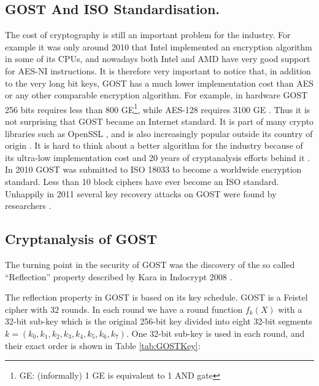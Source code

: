 \subsection{GOST And ISO Standardisation.}
The cost of cryptography is still an important problem for the industry.
For example it was only around 2010 that Intel implemented an encryption algorithm
in some of its CPUs, and nowadays both Intel and AMD have very good support for AES-NI instructions.
It is therefore very important to notice that,
in addition to the very long bit keys,
GOST has a much lower implementation cost
than AES or any other comparable encryption algorithm.
For example, in hardware GOST 256 bits requires less than 800 GE\footnote{GE: (informally) 1 GE is equivalent to 1 AND gate },
while AES-128 requires 3100 GE \cite{PoschmannImplement}.
Thus it is not surprising that GOST became an Internet standard.
It is part of many crypto libraries such as OpenSSL
\cite{GOSTRussianReferenceImplementation}, %
and is also increasingly popular %
outside its country of origin
\cite{PoschmannImplement}.
It is hard to think about a better algorithm for the industry
because of its ultra-low implementation cost and
20 years of cryptanalysis efforts behind it \cite{PoschmannImplement}.
In 2010 GOST was submitted to ISO 18033
to become a worldwide encryption standard.
Less than 10
block ciphers have ever become an
ISO %
standard.
Unhappily in 2011 several key recovery attacks on GOST were found by researchers
\cite{JapaneseGOSTMITMFSE2011,gostreport,gostac,gostdc0,gostdc2}.

\subsection{Cryptanalysis of GOST} \label{sec:CrytanalysisGOST}
The turning point in the security of GOST was the discovery of the so called
``Reflection'' property described by Kara in Indocrypt 2008 \cite{GOSTReflectionKara}.

The reflection property in GOST is based on its key schedule. GOST is a Feistel cipher with 32 rounds. In each round we have a round function $f_k(X)$ with a 32-bit sub-key which is the original 256-bit key divided into eight 32-bit segments $k = (k_0, k_1, k_2, k_3, k_4, k_5, k_6, k_7)$.
One 32-bit sub-key is used in each round, and their exact order is shown in Table \ref{tab:GOSTKey}:

